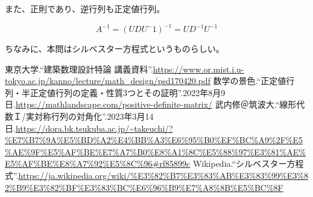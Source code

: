 \documentclass[a4paper, 10pt, dvipdfmx]{jlreq}
\begin{document}
また、正則であり、逆行列も正定値行列。

\begin{equation*}
  A^{-1}=(UDU^-1)^{-1}=UD^{-1}U^{-1}
\end{equation*}

ちなみに、本問はシルベスター方程式というものらしい。


\begin{thebibliography}{9}
  東京大学.``建築数理設計特論 講義資料''.\url{https://www.or.mist.i.u-tokyo.ac.jp/kanno/lecture/math_design/psd170420.pdf}
  数学の景色.``正定値行列・半正定値行列の定義・性質3つとその証明''.2022年8月9日.\url{https://mathlandscape.com/positive-definite-matrix/}
  武内修＠筑波大.``線形代数Ｉ/実対称行列の対角化''.2023年3月14日.\url{https://dora.bk.tsukuba.ac.jp/~takeuchi/?%E7%B7%9A%E5%BD%A2%E4%BB%A3%E6%95%B0%EF%BC%A9%2F%E5%AE%9F%E5%AF%BE%E7%A7%B0%E8%A1%8C%E5%88%97%E3%81%AE%E5%AF%BE%E8%A7%92%E5%8C%96#rf85899c}
  Wikipedia.``シルベスター方程式''.\url{https://ja.wikipedia.org/wiki/%E3%82%B7%E3%83%AB%E3%83%99%E3%82%B9%E3%82%BF%E3%83%BC%E6%96%B9%E7%A8%8B%E5%BC%8F}
\end{thebibliography}
\end{document}
